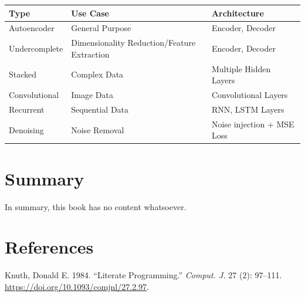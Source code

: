 \documentclass[
  letterpaper,
  DIV=11,
  numbers=noendperiod]{scrreprt}
\newlength{\cslhangindent}
\newenvironment{CSLReferences}[2] %
 {\begin{list}{}{%
  \setlength{\itemindent}{0pt}
  \setlength{\leftmargin}{0pt}
  \setlength{\parsep}{0pt}
  \ifodd #1
   \setlength{\leftmargin}{\cslhangindent}
   \setlength{\itemindent}{-1\cslhangindent}
  \fi
  \setlength{\itemsep}{#2\baselineskip}}}
 {\end{list}}
\begin{document}
\begin{longtable}[]{@{}
  >{\raggedright\arraybackslash}p{}
  >{\raggedright\arraybackslash}p{}
  >{\raggedright\arraybackslash}p{}@{}}
\toprule\noalign{}
\begin{minipage}[b]{\linewidth}\raggedright
Type
\end{minipage} & \begin{minipage}[b]{\linewidth}\raggedright
Use Case
\end{minipage} & \begin{minipage}[b]{\linewidth}\raggedright
Architecture
\end{minipage} \\
\midrule\noalign{}
\endhead
\bottomrule\noalign{}
\endlastfoot
Autoencoder & General Purpose & Encoder, Decoder \\
Undercomplete & Dimensionality Reduction/Feature Extraction & Encoder,
Decoder \\
Stacked & Complex Data & Multiple Hidden Layers \\
Convolutional & Image Data & Convolutional Layers \\
Recurrent & Sequential Data & RNN, LSTM Layers \\
Denoising & Noise Removal & Noise injection + MSE Loss \\
\end{longtable}


\chapter{Summary}\label{summary-1}

In summary, this book has no content whatsoever.


\chapter*{References}\label{references-2}


\label{refs}
\begin{CSLReferences}{1}{0}
Knuth, Donald E. 1984. {``Literate Programming.''} \emph{Comput. J.} 27
(2): 97--111. \url{https://doi.org/10.1093/comjnl/27.2.97}.

\end{CSLReferences}
\end{document}
